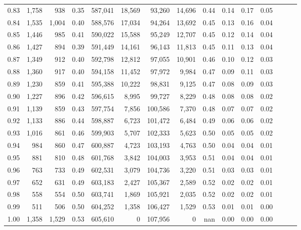 \begin{tabular}{rrrrrrrrrrrrrrr}
0.83 &   1,758 &    938 &  0.35 &  587,041 &   18,569 &   93,260 &   14,696 &  0.44 &  0.14 &  0.17 &      0.05 \\
0.84 &   1,535 &  1,004 &  0.40 &  588,576 &   17,034 &   94,264 &   13,692 &  0.45 &  0.13 &  0.16 &      0.04 \\
0.85 &   1,446 &    985 &  0.41 &  590,022 &   15,588 &   95,249 &   12,707 &  0.45 &  0.12 &  0.14 &      0.04 \\
0.86 &   1,427 &    894 &  0.39 &  591,449 &   14,161 &   96,143 &   11,813 &  0.45 &  0.11 &  0.13 &      0.04 \\
0.87 &   1,349 &    912 &  0.40 &  592,798 &   12,812 &   97,055 &   10,901 &  0.46 &  0.10 &  0.12 &      0.03 \\
0.88 &   1,360 &    917 &  0.40 &  594,158 &   11,452 &   97,972 &    9,984 &  0.47 &  0.09 &  0.11 &      0.03 \\
0.89 &   1,230 &    859 &  0.41 &  595,388 &   10,222 &   98,831 &    9,125 &  0.47 &  0.08 &  0.09 &      0.03 \\
0.90 &   1,227 &    896 &  0.42 &  596,615 &    8,995 &   99,727 &    8,229 &  0.48 &  0.08 &  0.08 &      0.02 \\
0.91 &   1,139 &    859 &  0.43 &  597,754 &    7,856 &  100,586 &    7,370 &  0.48 &  0.07 &  0.07 &      0.02 \\
0.92 &   1,133 &    886 &  0.44 &  598,887 &    6,723 &  101,472 &    6,484 &  0.49 &  0.06 &  0.06 &      0.02 \\
0.93 &   1,016 &    861 &  0.46 &  599,903 &    5,707 &  102,333 &    5,623 &  0.50 &  0.05 &  0.05 &      0.02 \\
0.94 &     984 &    860 &  0.47 &  600,887 &    4,723 &  103,193 &    4,763 &  0.50 &  0.04 &  0.04 &      0.01 \\
0.95 &     881 &    810 &  0.48 &  601,768 &    3,842 &  104,003 &    3,953 &  0.51 &  0.04 &  0.04 &      0.01 \\
0.96 &     763 &    733 &  0.49 &  602,531 &    3,079 &  104,736 &    3,220 &  0.51 &  0.03 &  0.03 &      0.01 \\
0.97 &     652 &    631 &  0.49 &  603,183 &    2,427 &  105,367 &    2,589 &  0.52 &  0.02 &  0.02 &      0.01 \\
0.98 &     558 &    554 &  0.50 &  603,741 &    1,869 &  105,921 &    2,035 &  0.52 &  0.02 &  0.02 &      0.01 \\
0.99 &     511 &    506 &  0.50 &  604,252 &    1,358 &  106,427 &    1,529 &  0.53 &  0.01 &  0.01 &      0.00 \\
1.00 &   1,358 &  1,529 &  0.53 &  605,610 &        0 &  107,956 &        0 &   nan &  0.00 &  0.00 &      0.00 \\
\bottomrule
\end{tabular}
